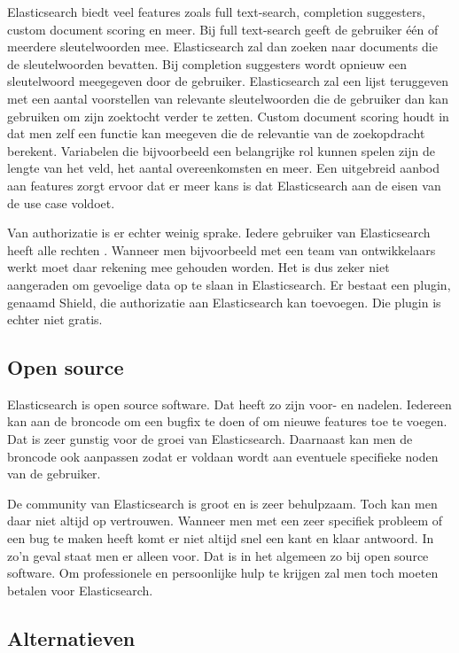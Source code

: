 Elasticsearch biedt veel features zoals full text-search, completion suggesters, custom document scoring en meer. Bij full text-search geeft de gebruiker één of meerdere sleutelwoorden mee. Elasticsearch zal dan zoeken naar documents die de sleutelwoorden bevatten. Bij completion suggesters wordt opnieuw een sleutelwoord meegegeven door de gebruiker. Elasticsearch zal een lijst teruggeven met een aantal voorstellen van relevante sleutelwoorden die de gebruiker dan kan gebruiken om zijn zoektocht verder te zetten. Custom document scoring houdt in dat men zelf een functie kan meegeven die de relevantie van de zoekopdracht berekent. Variabelen die bijvoorbeeld een belangrijke rol kunnen spelen zijn de lengte van het veld, het aantal overeenkomsten en meer. Een uitgebreid aanbod aan features zorgt ervoor dat er meer kans is dat Elasticsearch aan de eisen van de use case voldoet. 

Van authorizatie is er echter weinig sprake. Iedere gebruiker van Elasticsearch heeft alle rechten \autocite{Brasetvik2013}. Wanneer men bijvoorbeeld met een team van ontwikkelaars werkt moet daar rekening mee gehouden worden. Het is dus zeker niet aangeraden om gevoelige data op te slaan in Elasticsearch. Er bestaat een plugin, genaamd Shield, die authorizatie aan Elasticsearch kan toevoegen. Die plugin is echter niet gratis. 

\subsection{Open source}

Elasticsearch is open source software. Dat heeft zo zijn voor- en nadelen. Iedereen kan aan de broncode om een bugfix te doen of om nieuwe features toe te voegen. Dat is zeer gunstig voor de groei van Elasticsearch. Daarnaast kan men de broncode ook aanpassen zodat er voldaan wordt aan eventuele specifieke noden van de gebruiker. \autocite{Tahir2008}

De community van Elasticsearch is groot en is zeer behulpzaam. Toch kan men daar niet altijd op vertrouwen. Wanneer men met een zeer specifiek probleem of een bug te maken heeft komt er niet altijd snel een kant en klaar antwoord. In zo'n geval staat men er alleen voor. Dat is in het algemeen zo bij open source software. Om professionele en persoonlijke hulp te krijgen zal men toch moeten betalen voor Elasticsearch.

\subsection{Alternatieven}


